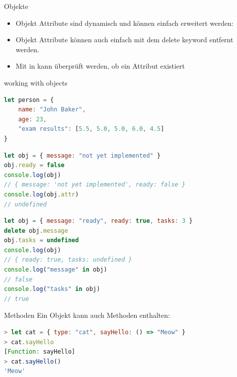 \begin{definition}{Objekte}
    \begin{itemize}
        \item Objekt Attribute sind dynamisch und können einfach erweitert werden:
        \item Objekt Attribute können auch einfach mit dem delete keyword entfernt werden.
        \item Mit in kann überprüft werden, ob ein Attribut existiert
    \end{itemize}
\end{definition}

\begin{example2}{working with objects}
\begin{lstlisting}[language=JavaScript, style=base]
let person = {
    name: "John Baker",
    age: 23,
    "exam results": [5.5, 5.0, 5.0, 6.0, 4.5]
}
\end{lstlisting}

\begin{lstlisting}[language=JavaScript, style=base]
let obj = { message: "not yet implemented" }
obj.ready = false
console.log(obj)
// { message: 'not yet implemented', ready: false }
console.log(obj.attr)
// undefined
\end{lstlisting}

\begin{lstlisting}[language=JavaScript, style=base]
let obj = { message: "ready", ready: true, tasks: 3 }
delete obj.message
obj.tasks = undefined
console.log(obj)
// { ready: true, tasks: undefined }
console.log("message" in obj)
// false
console.log("tasks" in obj)
// true
\end{lstlisting}
\end{example2}

\begin{definition}{Methoden}
    Ein Objekt kann auch Methoden enthalten:
\begin{lstlisting}[language=JavaScript, style=base]
> let cat = { type: "cat", sayHello: () => "Meow" }
> cat.sayHello
[Function: sayHello]
> cat.sayHello()
'Meow'
\end{lstlisting}
\end{definition}

